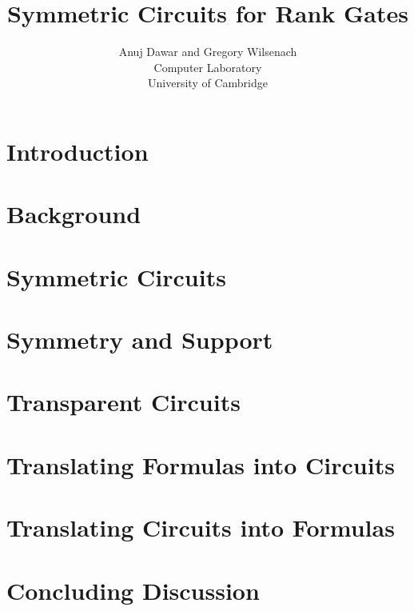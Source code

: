 \documentclass[12pt]{article}
\begin{document}
\title{Symmetric Circuits for Rank Gates}

\author{Anuj Dawar and Gregory Wilsenach \\ 
Computer Laboratory \\
University of Cambridge}

\maketitle

\tableofcontents
\newpage

\section{Introduction}

\newpage

\section{Background}\label{sec:background}

\newpage

\section{Symmetric Circuits}\label{sec:symm-circ}

\newpage

\section{Symmetry and Support}\label{sec:symm-support}

\newpage

\section{Transparent Circuits}\label{sec:transparent}


\section{Translating Formulas into Circuits}\label{sec:formulas-to-circuits}

\newpage

\section{Translating Circuits into Formulas}\label{sec:circuits-to-formulas}

\newpage

\section{Concluding Discussion}

\newpage



\end{document}
